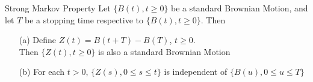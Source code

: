 \documentclass[letterpaper]{beamer}
\begin{document}
\begin{frame}{Strong Markov Property}
Let $\{B(t),t\ge 0\}$ be a standard Brownian Motion, and let $T$ be a stopping time respective to $\{B(t),t\ge 0\}$.
Then
\begin{itemize}
\item[(a)] Define $Z(t)=B(t+T)-B(T)$, $t\ge 0$.\\ Then $\{Z(t), t\ge 0\}$ is also a standard Brownian Motion
\item[(b)] For each $t>0$, $\{Z(s), 0\le s\le t\}$ is independent of $\{B(u), 0\le u\le T\}$
\end{itemize}\medskip

\begin{center}
%
\end{center}

\end{frame}
\end{document}
